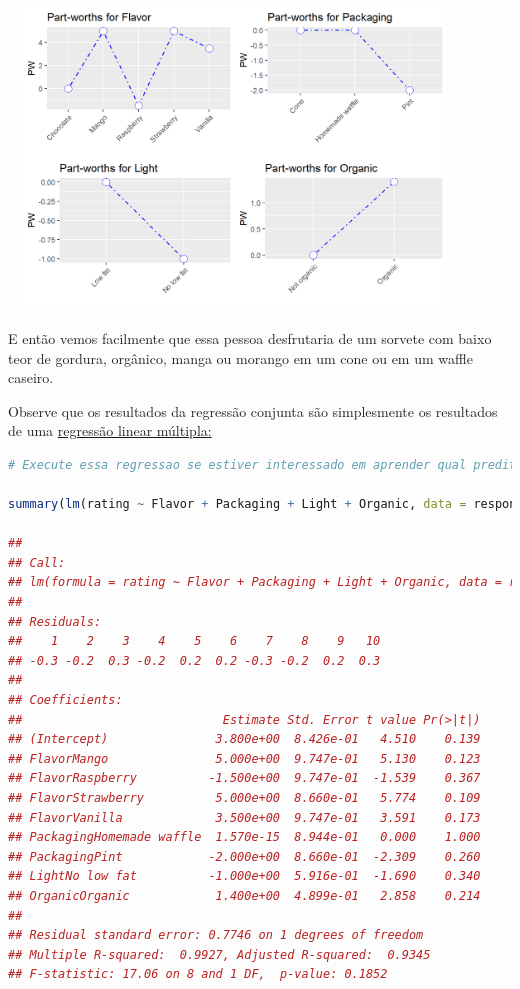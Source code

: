 \documentclass{article}
\begin{document}
\begin{center}
\includegraphics[width=12cm,height=8cm]{conjoint_onerespondent_plot-1.png}
\end{center}

E então vemos facilmente que essa pessoa desfrutaria de um sorvete com baixo teor de gordura, orgânico, manga ou morango em um cone ou em um waffle caseiro.

Observe que os resultados da regressão conjunta são simplesmente os resultados de uma \href{https://bookdown.org/content/1340/linear-regression.html#regression_without}{regressão linear múltipla:}

\begin{lstlisting}[language=R]
# Execute essa regressao se estiver interessado em aprender qual preditor eh significativo ou qual eh o R quadrado do modelo geral.

summary(lm(rating ~ Flavor + Packaging + Light + Organic, data = respondent1))

## 
## Call:
## lm(formula = rating ~ Flavor + Packaging + Light + Organic, data = respondent1)
## 
## Residuals:
##    1    2    3    4    5    6    7    8    9   10 
## -0.3 -0.2  0.3 -0.2  0.2  0.2 -0.3 -0.2  0.2  0.3 
## 
## Coefficients:
##                            Estimate Std. Error t value Pr(>|t|)
## (Intercept)               3.800e+00  8.426e-01   4.510    0.139
## FlavorMango               5.000e+00  9.747e-01   5.130    0.123
## FlavorRaspberry          -1.500e+00  9.747e-01  -1.539    0.367
## FlavorStrawberry          5.000e+00  8.660e-01   5.774    0.109
## FlavorVanilla             3.500e+00  9.747e-01   3.591    0.173
## PackagingHomemade waffle  1.570e-15  8.944e-01   0.000    1.000
## PackagingPint            -2.000e+00  8.660e-01  -2.309    0.260
## LightNo low fat          -1.000e+00  5.916e-01  -1.690    0.340
## OrganicOrganic            1.400e+00  4.899e-01   2.858    0.214
## 
## Residual standard error: 0.7746 on 1 degrees of freedom
## Multiple R-squared:  0.9927, Adjusted R-squared:  0.9345 
## F-statistic: 17.06 on 8 and 1 DF,  p-value: 0.1852
\end{lstlisting}
\end{document}
